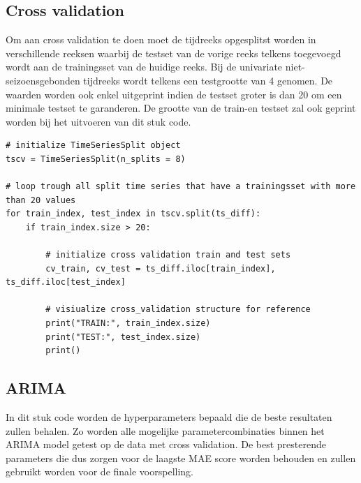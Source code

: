 \subsection{Cross validation}

Om aan cross validation te doen moet de tijdreeks opgesplitst worden in verschillende reeksen waarbij de testset van de vorige reeks telkens toegevoegd wordt aan de trainingsset van de huidige reeks. Bij de univariate niet-seizoensgebonden tijdreeks wordt telkens een testgrootte van 4 genomen. De waarden worden ook enkel uitgeprint indien de testset groter is dan 20 om een minimale testset te garanderen. De grootte van de train-en testset zal ook geprint worden bij het uitvoeren van dit stuk code.

\begin{verbatim}
# initialize TimeSeriesSplit object
tscv = TimeSeriesSplit(n_splits = 8)

# loop trough all split time series that have a trainingsset with more than 20 values
for train_index, test_index in tscv.split(ts_diff):
    if train_index.size > 20:

        # initialize cross validation train and test sets
        cv_train, cv_test = ts_diff.iloc[train_index], ts_diff.iloc[test_index]
        
        # visiualize cross_validation structure for reference
        print("TRAIN:", train_index.size)
        print("TEST:", test_index.size)
        print()
\end{verbatim}

\subsection{ARIMA}

In dit stuk code worden de hyperparameters bepaald die de beste resultaten zullen behalen. Zo worden alle mogelijke parametercombinaties binnen het ARIMA model getest op de data met cross validation. De best presterende parameters die dus zorgen voor de laagste MAE score worden behouden en zullen gebruikt worden voor de finale voorspelling.

